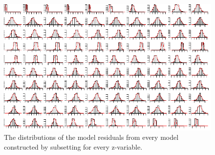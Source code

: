 \documentclass[11pt, fleqn, titlepage]{article}
\begin{document}
\begin{figure}[H]
	\centering
	\includegraphics[width=0.9\linewidth]{billeder/residu3}
	\caption{The distributions of the model residuals from every model constructed by subsetting for every z-variable.}
	\label{fig:residu3}
\end{figure}	

\newpage


\end{document}

